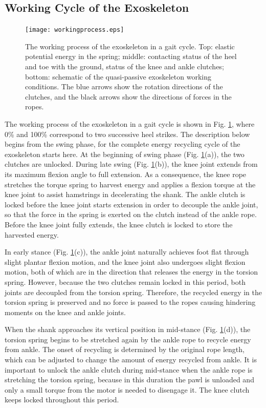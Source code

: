 \documentclass[twocolumn,cleanfoot,10pt]{asme2ej}
\begin{document}

\subsection{Working Cycle of the Exoskeleton}
\label{subsec:Working process}

\begin{figure}[tb]
	\centering
	\texttt{[image: workingprocess.eps]}
	\caption{The working process of the exoskeleton in a gait cycle.
	Top: elastic potential energy in the spring; middle: contacting status of the heel and toe with the ground, status of the knee and ankle clutches; bottom: schematic of the quasi-passive exoskeleton working conditions.
	The blue arrows show the rotation directions of the clutches, and the black arrows show the directions of forces in the ropes.}
	\label{fig:workprocess}   
\end{figure}

The working process of the exoskeleton in a gait cycle is shown in Fig. \ref{fig:workprocess}, where 0\% and 100\% correspond to two successive heel strikes.
The description below begins from the swing phase, for the complete energy recycling cycle of the exoskeleton starts here.
At the beginning of swing phase (Fig. \ref{fig:workprocess}(a)), the two clutches are unlocked.
During late swing (Fig. \ref{fig:workprocess}(b)), the knee joint extends from its maximum flexion angle to full extension.
As a consequence, the knee rope stretches the torque spring to harvest energy and applies a flexion torque at the knee joint to assist hamstrings in decelerating the shank.
The ankle clutch is locked before the knee joint starts extension in order to decouple the ankle joint, so that the force in the spring is exerted on the clutch instead of the ankle rope.
Before the knee joint fully extends, the knee clutch is locked to store the harvested energy.

In early stance (Fig. \ref{fig:workprocess}(c)), the ankle joint naturally achieves foot flat through slight plantar flexion motion, and the knee joint also undergoes slight flexion motion, both of which are in the direction that releases the energy in the torsion spring.
However, because the two clutches remain locked in this period, both joints are decoupled from the torsion spring.
Therefore, the recycled energy in the torsion spring is preserved and no force is passed to the ropes causing hindering moments on the knee and ankle joints.

When the shank approaches its vertical position in mid-stance (Fig. \ref{fig:workprocess}(d)), the torsion spring begins to be stretched again by the ankle rope to recycle energy from ankle.
The onset of recycling is determined by the original rope length, which can be adjusted to change the amount of energy recycled from ankle.
It is important to unlock the ankle clutch during mid-stance when the ankle rope is stretching the torsion spring, because in this duration the pawl is unloaded and only a small torque from the motor is needed to disengage it.
The knee clutch keeps locked throughout this period.
\end{document}
